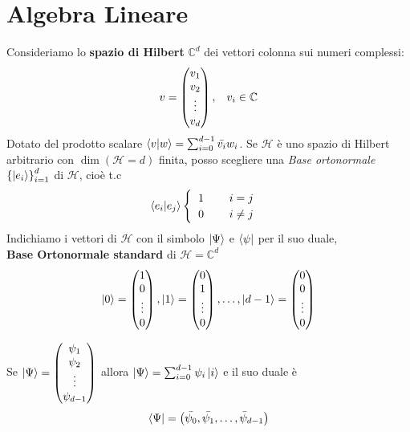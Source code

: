 \documentclass{report}
\begin{document}
\section{Algebra Lineare}
Consideriamo lo \textbf{spazio di Hilbert} $\mathbb{C}^d$ dei vettori colonna sui numeri complessi:
$$
v =
\begin{pmatrix}
  v_1 \\
  v_2 \\
  \vdots \\
  v_d
\end{pmatrix},
\hspace{0.3cm} v_i \in \mathbb{C}
$$
Dotato del prodotto scalare $\braket{v|w} = \sum^{d-1}_{i=0}\bar{v_i}w_i$.
Se $\mathcal{H}$ è uno spazio di Hilbert arbitrario con $\dim(\mathcal{H} = d)$ finita, posso scegliere una \textit{Base ortonormale} $\left\{ \ket{e_i} \right\}^d_{i=1}$ di $\mathcal{H}$, cioè t.c
$$\braket{e_i|e_j} 
\begin{cases}
 \hspace{0.2cm}1 \hspace{0.8cm} i=j \\
 \hspace{0.2cm}0 \hspace{0.8cm} i\neq j
\end{cases}
$$
Indichiamo i vettori di $\mathcal{H}$ con il simbolo $\ket{\Psi}$ e $\bra{\psi}$ per il suo duale,
\\ \textbf{Base Ortonormale standard} di $\mathcal{H} = \mathbb{C}^d$
$$
\ket{0}=
\begin{pmatrix}
    1 \\
    0 \\
    \vdots \\
    0
\end{pmatrix}, 
\ket{1}=
\begin{pmatrix}
    0 \\
    1 \\
    \vdots \\
    0
\end{pmatrix}, \dots,
\ket{d-1}=
\begin{pmatrix}
    0 \\
    0 \\
    \vdots \\
    0
\end{pmatrix}
$$

Se $\ket{\Psi} = 
\begin{pmatrix}
    \psi_1 \\
    \psi_2 \\
    \vdots \\
    \psi_{d-1}
\end{pmatrix}
$
 allora $\ket{\Psi} = \sum^{d-1}_{i=0}\psi_i \ket{i}$ e il suo duale è $$\bra{\Psi} = \left(\bar{\psi_0},\bar{\psi_1},\dots,\bar{\psi}_{d-1} \right)$$
\end{document}
